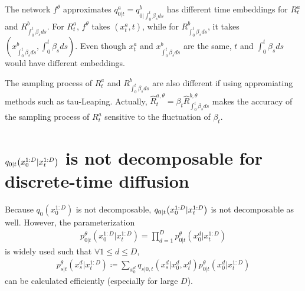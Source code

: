 \documentclass[10pt]{article}
\begin{document}
The network $f^\theta$ approximates $q^a_{0|t}=q^b_{0|\int_0^t\beta_s ds}$ has different time embeddings for $R^a_t$ and $R^b_{\int_0^t\beta_s ds}$. For $R^a_t$, $f^\theta$ takes $(x^a_t, t)$, while for $R^b_{\int_0^t\beta_s ds}$, it takes $(x^b_{\int_0^t\beta_s ds}, {\int_0^t\beta_s ds})$. Even though $x^a_t$ and $x^b_{\int_0^t\beta_s ds}$ are the same, $t$ and $\int_0^t\beta_s ds$ would have different embeddings.

The sampling process of $R^a_t$ and $R^b_{\int_0^t\beta_s ds}$ are also different if using appromiating methods such as tau-Leaping. Actually, $\hat{R}^{a,\theta}_t=\beta_t\hat{R}^{b,\theta}_{\int_0^t\beta_s ds}$ makes the accuracy of the sampling process of $R^a_t$ sensitive to the fluctuation of $\beta_t$.

\section{$q_{0|t}\qty(x_0^{1:D}|x_t^{1:D})$ is not decomposable for discrete-time diffusion}
Because $q_0(x_0^{1:D})$ is not decomposable, $q_{0|t}\qty(x_0^{1:D}|x_t^{1:D})$ is not decomposable as well. However, the parameterization
\begin{eqnarray}\label{Eqp0tCompose}
  p^\theta_{0|t}(x_0^{1:D}|x_t^{1:D}) = \prod_{d=1}^D p^\theta_{0|t}(x_0^d|x_t^{1:D})
\end{eqnarray}
is widely used such that $\forall 1\le d\le D$,
\begin{eqnarray*}
  p^\theta_{s|t}(x_s^d|x_t^{1:D})\coloneq \sum_{x_0^d}q_{s|0,t}(x_s^d|x_0^d,x_t^d)p^\theta_{0|t}(x_0^d|x_t^{1:D})
\end{eqnarray*}
can be calculated efficiently (especially for large $D$).
\end{document}
